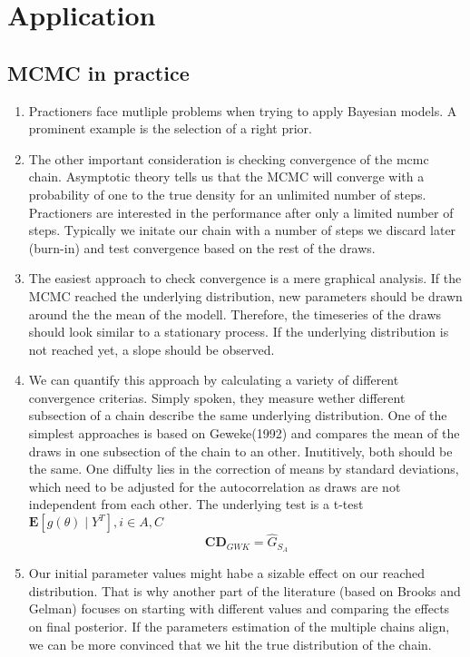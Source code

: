 \section{Application}

\subsection{MCMC in practice}
\begin{enumerate}
 \item Practioners face mutliple problems when trying to apply Bayesian models. A prominent example is the selection of a right prior.

\item The other important consideration is checking convergence of the mcmc chain. Asymptotic theory tells us that the MCMC will converge with a probability of one to the true density for an unlimited number of steps. Practioners are interested in the performance after only a limited number of steps. 
Typically we initate our chain with a number of steps we discard later (burn-in) and test convergence based on the rest of the draws.
\item  
The easiest approach to check convergence is a mere graphical analysis. If the MCMC reached the underlying distribution, new parameters should be drawn around the the mean of the modell. Therefore, the timeseries of the draws should look similar to a stationary process. If the underlying distribution is not reached yet, a slope should be observed. 

\item We can quantify this approach by calculating a variety of different convergence criterias. Simply spoken, they measure wether different subsection of a chain describe the same underlying distribution. One of the simplest approaches is based on Geweke(1992) and compares the mean of the draws in one subsection of the chain to an other. Inutitively, both should be the same. One diffulty lies in the correction of means by standard deviations, which need to be adjusted for the autocorrelation as draws are not independent from each other. The underlying test is a t-test $\mathbf{E}\left[g(\theta) \mid Y^T\right], i \in {A,C}$
$$\mathbf{CD}_{GW K}=\hat{G}_{S_A}$$


\item Our initial parameter values might habe a sizable effect on our reached distribution. That is why another part of the literature (based on Brooks and Gelman) focuses on starting with different values and comparing the effects on final posterior. If the parameters estimation of the multiple chains align, we can be more convinced that we hit the true distribution of the chain. 

\end{enumerate}



